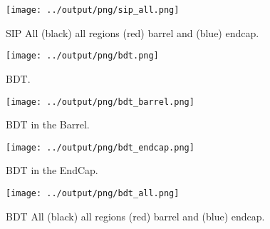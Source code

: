 \documentclass[11pt]{book}
\begin{document}
\begin{figure}[htb]
\centering
\texttt{[image: ../output/png/sip\_all.png]}
\caption{SIP All (black) all regions (red) barrel and (blue) endcap.}
\label{fig:sip_all}
\end{figure}

\begin{figure}[htb]
\centering
\texttt{[image: ../output/png/bdt.png]}
\caption{BDT.}
\label{fig:bdt}
\end{figure}

\begin{figure}[htb]
\centering
\texttt{[image: ../output/png/bdt\_barrel.png]}
\caption{BDT in the Barrel.}
\label{fig:bdt_barrel}
\end{figure}

\begin{figure}[htb]
\centering
\texttt{[image: ../output/png/bdt\_endcap.png]}
\caption{BDT in the EndCap.}
\label{fig:bdt_endcap}
\end{figure}

\begin{figure}[htb]
\centering
\texttt{[image: ../output/png/bdt\_all.png]}
\caption{BDT All (black) all regions (red) barrel and (blue) endcap.}
\label{fig:bdt_all}
\end{figure}
\clearpage


\end{document}
